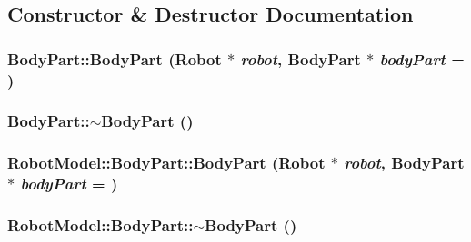 \subsection{Constructor \& Destructor Documentation}
\hypertarget{class_robot_model_1_1_body_part_a1f6265932a76d89dc77b0b6185966913}{
\subsubsection[{BodyPart}]{\setlength{\rightskip}{0pt plus 5cm}BodyPart::BodyPart ({\bf Robot} $\ast$ {\em robot}, \/  {\bf BodyPart} $\ast$ {\em bodyPart} = {})}}
\label{class_robot_model_1_1_body_part_a1f6265932a76d89dc77b0b6185966913}
\hypertarget{class_robot_model_1_1_body_part_a0d51eaacbf15745175b21bf44f67a92a}{
\subsubsection[{$\sim$BodyPart}]{\setlength{\rightskip}{0pt plus 5cm}BodyPart::$\sim$BodyPart ()}}
\label{class_robot_model_1_1_body_part_a0d51eaacbf15745175b21bf44f67a92a}
\hypertarget{class_robot_model_1_1_body_part_a215d63b6bed4559e0c54d98e913111c9}{
\subsubsection[{BodyPart}]{\setlength{\rightskip}{0pt plus 5cm}RobotModel::BodyPart::BodyPart ({\bf Robot} $\ast$ {\em robot}, \/  {\bf BodyPart} $\ast$ {\em bodyPart} = {})}}
\label{class_robot_model_1_1_body_part_a215d63b6bed4559e0c54d98e913111c9}
\hypertarget{class_robot_model_1_1_body_part_a9740eb72ccdaa56e8e91c999a645867f}{
\subsubsection[{$\sim$BodyPart}]{\setlength{\rightskip}{0pt plus 5cm}RobotModel::BodyPart::$\sim$BodyPart ()}}
\label{class_robot_model_1_1_body_part_a9740eb72ccdaa56e8e91c999a645867f}


